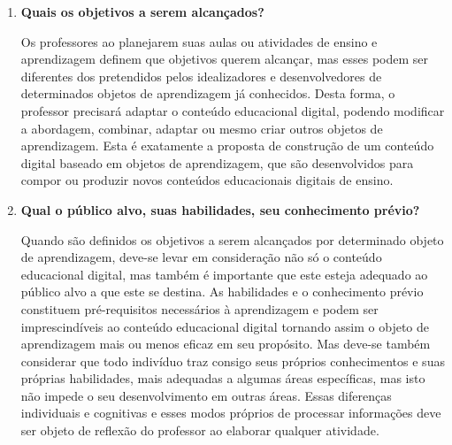 \documentclass[12pt, openright, a4paper, brazil, english, french, spanish, bibjustif, openany, oneside]{abntex2}
\begin{document}





\begin{enumerate}[label=\textbf{\alph*)}]

\item \textbf{Quais os objetivos a serem alcançados?}

Os professores ao planejarem suas aulas ou atividades de ensino e aprendizagem definem que objetivos querem alcançar, mas esses podem ser diferentes dos pretendidos pelos idealizadores e desenvolvedores de determinados objetos de aprendizagem já conhecidos. Desta forma, o professor precisará adaptar o conteúdo educacional digital, podendo modificar a abordagem, combinar, adaptar ou mesmo criar outros objetos de aprendizagem.  Esta é exatamente a proposta de construção de um conteúdo digital baseado em objetos de aprendizagem, que são desenvolvidos para compor ou produzir novos conteúdos educacionais digitais de ensino.

\item \textbf{Qual o público alvo, suas habilidades, seu conhecimento prévio?}

Quando são definidos os objetivos a serem alcançados por determinado objeto de aprendizagem, deve-se levar em consideração não só o conteúdo educacional digital, mas também é importante que este esteja adequado ao público alvo a que este se destina. As habilidades e o conhecimento prévio constituem pré-requisitos necessários à aprendizagem e podem ser imprescindíveis ao conteúdo educacional digital tornando assim o objeto de aprendizagem mais ou menos eficaz em seu propósito. Mas deve-se também considerar que todo indivíduo traz consigo seus próprios conhecimentos e suas próprias habilidades, mais adequadas a algumas áreas específicas, mas isto não impede o seu desenvolvimento em outras áreas. Essas diferenças individuais e cognitivas e esses modos próprios de processar informações deve ser objeto de reflexão do professor ao elaborar qualquer atividade.


\end{enumerate}
\end{document}
